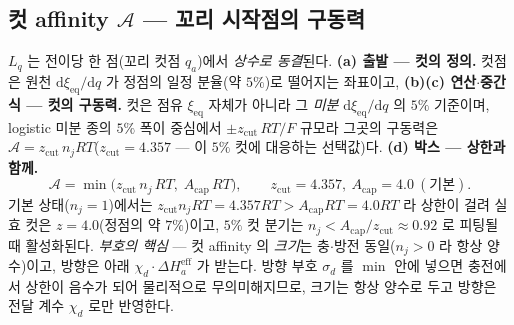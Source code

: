 \documentclass[11pt,a4paper]{article}
\newcommand{\dd}{\mathrm{d}}
\newcommand{\eff}{\mathrm{eff}}
\newcommand{\eq}{\mathrm{eq}}
\begin{document}
\subsection{컷 affinity $\mathcal A$ — 꼬리 시작점의 구동력}
$L_q$ 는 전이당 한 점(꼬리 컷점 $q_a$)에서 \emph{상수로 동결}된다. \textbf{(a) 출발 — 컷의 정의.} 컷점은 원천
$\dd\xi_\eq/\dd q$ 가 정점의 일정 분율(약 $5\%$)로 떨어지는 좌표이고, \textbf{(b)(c) 연산$\cdot$중간식 — 컷의 구동력.}
컷은 점유 $\xi_\eq$ 자체가 아니라 그 \emph{미분} $\dd\xi_\eq/\dd q$ 의 $5\%$ 기준이며, logistic 미분 종의 $5\%$
폭이 중심에서 $\pm z_\mathrm{cut}\,RT/F$ 규모라 그곳의 구동력은 $\mathcal A=z_\mathrm{cut}\,n_jRT$($z_\mathrm{cut}=4.357$
— 이 $5\%$ 컷에 대응하는 선택값)다. \textbf{(d) 박스 — 상한과 함께.}
\begin{equation}
\mathcal A=\min\!\big(z_\mathrm{cut}\,n_j\,RT,\;A_\mathrm{cap}\,RT\big),
\qquad z_\mathrm{cut}=4.357,\ A_\mathrm{cap}=4.0\ (\text{기본}).
\label{eq:Acut}
\end{equation}
기본 상태($n_j{=}1$)에서는 $z_\mathrm{cut}n_jRT=4.357RT>A_\mathrm{cap}RT=4.0RT$ 라 상한이 걸려 실효
컷은 $z=4.0$(정점의 약 $7\%$)이고, $5\%$ 컷 분기는 $n_j<A_\mathrm{cap}/z_\mathrm{cut}\approx0.92$ 로
피팅될 때 활성화된다.
\emph{부호의 핵심} — 컷 affinity 의 \emph{크기}는
충$\cdot$방전 동일($n_j>0$ 라 항상 양수)이고, 방향은 아래 $\chi_d\cdot\Delta H_a^\eff$ 가 받는다. 방향 부호 $\sigma_d$ 를
$\min$ 안에 넣으면 충전에서 상한이 음수가 되어 물리적으로 무의미해지므로, 크기는 항상 양수로 두고 방향은 전달
계수 $\chi_d$ 로만 반영한다.
\end{document}
